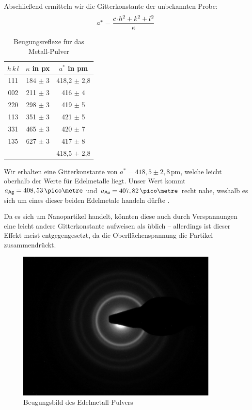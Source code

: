 Abschließend ermitteln wir die Gitterkonstante der unbekannten Probe:
\begin{equation}
a^* = \frac{c \!\cdot\! h^2 + k^2 + l^2}{\kappa}
\end{equation}

\begin{table}[p]
\centering
\caption{Beugungsreflexe für das Metall-Pulver}	\label{tab:Edel}
\begin{tabular}{*3c}
	\toprule
	$h\,k\,l$	& $\kappa$ in px	& $a^*$ in pm	\\
	\midrule
	111		& 184 $\pm$ 3		& 418,2 $\pm$ 2,8		\\
	002		& 211 $\pm$ 3		& 416 $\pm$ 4		\\
	220		& 298 $\pm$ 3		& 419 $\pm$ 5		\\
	113		& 351 $\pm$ 3		& 421 $\pm$ 5		\\
	331		& 465 $\pm$ 3		& 420 $\pm$ 7		\\
	135		& 627 $\pm$ 3		& 417 $\pm$ 8		\\
	\midrule
			&				& 418,5 $\pm$ 2,8	\\
	\bottomrule
\end{tabular}
\end{table}

Wir erhalten eine Gitterkonstante von $a^* = 418,5 \pm 2,8$\,pm, welche leicht oberhalb der Werte für Edelmetalle liegt. Unser Wert kommt $a_\mathsf{Ag} = 408,53\,\pico\metre$ und $a_\mathsf{Au} = 407,82\,\pico\metre$ recht nahe, weshalb es sich um eines dieser beiden Edelmetale handeln dürfte \cite{lit:elements}.

Da es sich um Nanopartikel handelt, könnten diese auch durch Verspannungen eine leicht andere Gitterkonstante aufweisen als üblich -- allerdings ist dieser Effekt meist entgegengesetzt, da die Oberflächenspannung die Partikel zusammendrückt.



\begin{figure}[p]
	\centering
	\includegraphics[width=0.9\textwidth]{data/Im_10.jpg}
	\caption{Beugungsbild des Edelmetall-Pulvers}				\label{fig:Edel}
\end{figure}

